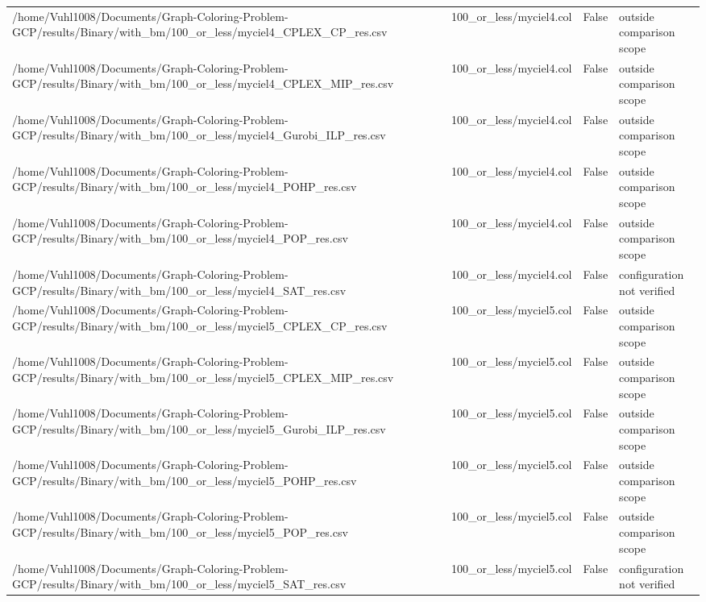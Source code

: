 \begin{table}[htbp]
\begin{tabular}{llll}
/home/Vuhl1008/Documents/Graph-Coloring-Problem-GCP/results/Binary/with\_bm/100\_or\_less/myciel4\_CPLEX\_CP\_res.csv & 100\_or\_less/myciel4.col & False & outside comparison scope \\
/home/Vuhl1008/Documents/Graph-Coloring-Problem-GCP/results/Binary/with\_bm/100\_or\_less/myciel4\_CPLEX\_MIP\_res.csv & 100\_or\_less/myciel4.col & False & outside comparison scope \\
/home/Vuhl1008/Documents/Graph-Coloring-Problem-GCP/results/Binary/with\_bm/100\_or\_less/myciel4\_Gurobi\_ILP\_res.csv & 100\_or\_less/myciel4.col & False & outside comparison scope \\
/home/Vuhl1008/Documents/Graph-Coloring-Problem-GCP/results/Binary/with\_bm/100\_or\_less/myciel4\_POHP\_res.csv & 100\_or\_less/myciel4.col & False & outside comparison scope \\
/home/Vuhl1008/Documents/Graph-Coloring-Problem-GCP/results/Binary/with\_bm/100\_or\_less/myciel4\_POP\_res.csv & 100\_or\_less/myciel4.col & False & outside comparison scope \\
/home/Vuhl1008/Documents/Graph-Coloring-Problem-GCP/results/Binary/with\_bm/100\_or\_less/myciel4\_SAT\_res.csv & 100\_or\_less/myciel4.col & False & configuration not verified \\
/home/Vuhl1008/Documents/Graph-Coloring-Problem-GCP/results/Binary/with\_bm/100\_or\_less/myciel5\_CPLEX\_CP\_res.csv & 100\_or\_less/myciel5.col & False & outside comparison scope \\
/home/Vuhl1008/Documents/Graph-Coloring-Problem-GCP/results/Binary/with\_bm/100\_or\_less/myciel5\_CPLEX\_MIP\_res.csv & 100\_or\_less/myciel5.col & False & outside comparison scope \\
/home/Vuhl1008/Documents/Graph-Coloring-Problem-GCP/results/Binary/with\_bm/100\_or\_less/myciel5\_Gurobi\_ILP\_res.csv & 100\_or\_less/myciel5.col & False & outside comparison scope \\
/home/Vuhl1008/Documents/Graph-Coloring-Problem-GCP/results/Binary/with\_bm/100\_or\_less/myciel5\_POHP\_res.csv & 100\_or\_less/myciel5.col & False & outside comparison scope \\
/home/Vuhl1008/Documents/Graph-Coloring-Problem-GCP/results/Binary/with\_bm/100\_or\_less/myciel5\_POP\_res.csv & 100\_or\_less/myciel5.col & False & outside comparison scope \\
/home/Vuhl1008/Documents/Graph-Coloring-Problem-GCP/results/Binary/with\_bm/100\_or\_less/myciel5\_SAT\_res.csv & 100\_or\_less/myciel5.col & False & configuration not verified \\

\end{tabular}
\end{table}

